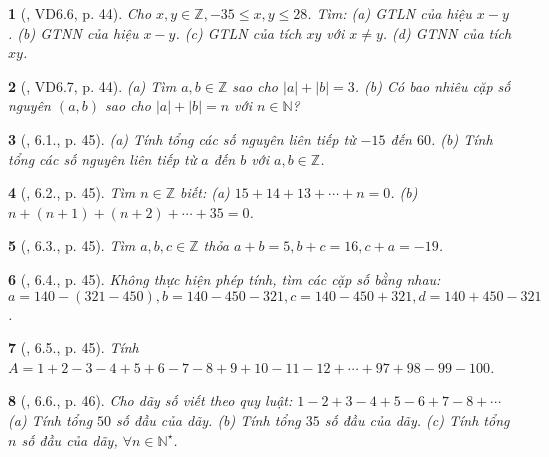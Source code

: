 \documentclass{article}
\newtheorem{baitoan}{}
\begin{document}
\begin{baitoan}[\cite{TLCT_THCS_Toan_6_so_hoc}, VD6.6, p. 44]
	Cho $x,y\in\mathbb{Z},-35\le x,y\le28$. Tìm: (a) {\rm GTLN} của hiệu $x - y$. (b) {\rm GTNN} của hiệu $x - y$. (c) {\rm GTLN} của tích $xy$ với $x\ne y$. (d) {\rm GTNN} của tích $xy$.
\end{baitoan}

\begin{baitoan}[\cite{TLCT_THCS_Toan_6_so_hoc}, VD6.7, p. 44]
	(a) Tìm $a,b\in\mathbb{Z}$ sao cho $|a| + |b| = 3$. (b) Có bao nhiêu cặp số nguyên $(a,b)$ sao cho $|a| + |b| = n$ với $n\in\mathbb{N}$?
\end{baitoan}

\begin{baitoan}[\cite{TLCT_THCS_Toan_6_so_hoc}, 6.1., p. 45]
	(a) Tính tổng các số nguyên liên tiếp từ $-15$ đến $60$. (b) Tính tổng các số nguyên liên tiếp từ $a$ đến $b$ với $a,b\in\mathbb{Z}$.
\end{baitoan}

\begin{baitoan}[\cite{TLCT_THCS_Toan_6_so_hoc}, 6.2., p. 45]
	Tìm $n\in\mathbb{Z}$ biết: (a) $15 + 14 + 13 + \cdots + n = 0$. (b) $n + (n + 1) + (n + 2) + \cdots + 35 = 0$.
\end{baitoan}

\begin{baitoan}[\cite{TLCT_THCS_Toan_6_so_hoc}, 6.3., p. 45]
	Tìm $a,b,c\in\mathbb{Z}$ thỏa $a + b = 5,b + c = 16,c + a = -19$.
\end{baitoan}

\begin{baitoan}[\cite{TLCT_THCS_Toan_6_so_hoc}, 6.4., p. 45]
	Không thực hiện phép tính, tìm các cặp số bằng nhau: $a = 140 - (321 - 450),b = 140 - 450 - 321,c = 140 - 450 + 321,d = 140 + 450 - 321$.
\end{baitoan}

\begin{baitoan}[\cite{TLCT_THCS_Toan_6_so_hoc}, 6.5., p. 45]
	Tính $A = 1 + 2 - 3 - 4 + 5 + 6 - 7 - 8 + 9 + 10 - 11 - 12 + \cdots + 97 + 98 - 99 - 100$.
\end{baitoan}

\begin{baitoan}[\cite{TLCT_THCS_Toan_6_so_hoc}, 6.6., p. 46]
	Cho dãy số viết theo quy luật: $1 - 2 + 3 - 4 + 5 - 6 + 7 - 8 + \cdots$ (a) Tính tổng $50$ số đầu của dãy. (b) Tính tổng $35$ số đầu của dãy. (c) Tính tổng $n$ số đầu của dãy, $\forall n\in\mathbb{N}^\star$.
\end{baitoan}
\end{document}
